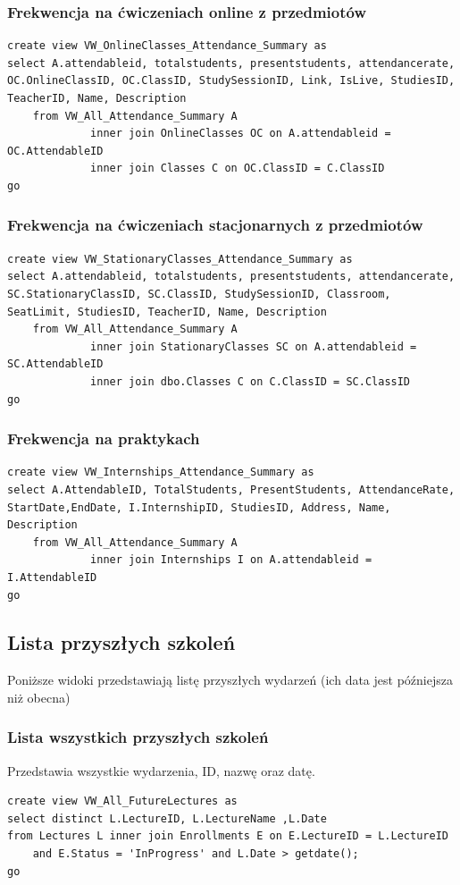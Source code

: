 \documentclass[11pt,a4paper]{article}
\begin{document}
\subsubsection{Frekwencja na ćwiczeniach online z przedmiotów}
\begin{Verbatim}[breaklines=true]
create view VW_OnlineClasses_Attendance_Summary as
select A.attendableid, totalstudents, presentstudents, attendancerate, OC.OnlineClassID, OC.ClassID, StudySessionID, Link, IsLive, StudiesID, TeacherID, Name, Description
    from VW_All_Attendance_Summary A
             inner join OnlineClasses OC on A.attendableid = OC.AttendableID
             inner join Classes C on OC.ClassID = C.ClassID
go
\end{Verbatim}

\subsubsection{Frekwencja na ćwiczeniach stacjonarnych z przedmiotów}
\begin{Verbatim}[breaklines=true]
create view VW_StationaryClasses_Attendance_Summary as
select A.attendableid, totalstudents, presentstudents, attendancerate, SC.StationaryClassID, SC.ClassID, StudySessionID, Classroom, SeatLimit, StudiesID, TeacherID, Name, Description
    from VW_All_Attendance_Summary A
             inner join StationaryClasses SC on A.attendableid = SC.AttendableID
             inner join dbo.Classes C on C.ClassID = SC.ClassID
go
\end{Verbatim}

\subsubsection{Frekwencja na praktykach}
\begin{Verbatim}[breaklines=true]
create view VW_Internships_Attendance_Summary as
select A.AttendableID, TotalStudents, PresentStudents, AttendanceRate, StartDate,EndDate, I.InternshipID, StudiesID, Address, Name, Description
    from VW_All_Attendance_Summary A
             inner join Internships I on A.attendableid = I.AttendableID
go
\end{Verbatim}
    
\subsection{Lista przyszłych szkoleń}
Poniższe widoki przedstawiają listę przyszłych wydarzeń (ich data jest późniejsza niż obecna) 
\subsubsection{Lista wszystkich przyszłych szkoleń}
Przedstawia wszystkie wydarzenia, ID, nazwę oraz datę.
\begin{Verbatim}[breaklines=true]
create view VW_All_FutureLectures as
select distinct L.LectureID, L.LectureName ,L.Date
from Lectures L inner join Enrollments E on E.LectureID = L.LectureID
    and E.Status = 'InProgress' and L.Date > getdate();
go
\end{Verbatim}
\end{document}
